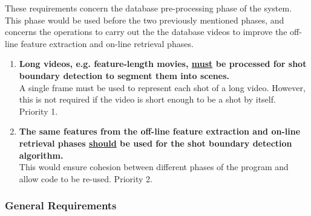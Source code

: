 These requirements concern the database pre-processing phase of the system. This phase would be used before the two previously mentioned phases, and concerns the operations to carry out the the database videos to improve the off-line feature extraction and on-line retrieval phases.

\begin{enumerate}[label=F\arabic*,resume]

    \item \textbf{Long videos, e.g. feature-length movies, \underline{must} be processed for shot boundary detection to segment them into scenes.}\\
    A single frame must be used to represent each shot of a long video. However, this is not required if the video is short enough to be a shot by itself.\\
    Priority 1.
    
    \item \textbf{The same features from the off-line feature extraction and on-line retrieval phases \underline{should} be used for the shot boundary detection algorithm.}\\
    This would ensure cohesion between different phases of the program and allow code to be re-used.
    Priority 2.
    
\end{enumerate}

\subsubsection{General Requirements}

